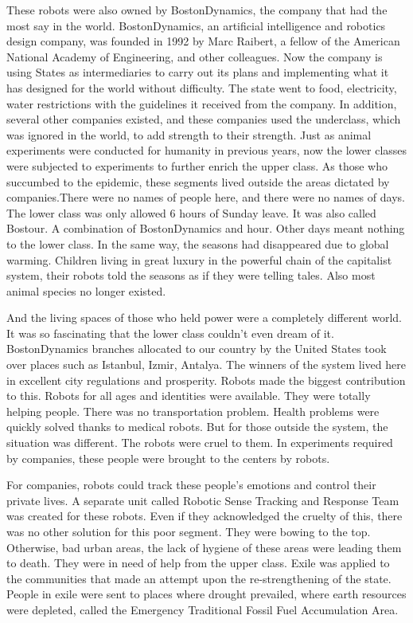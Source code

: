 \documentclass[]{book}
\begin{document}
These robots were also owned by BostonDynamics, the company that had the most say in the world. BostonDynamics, an artificial intelligence and robotics design company, was founded in 1992 by Marc Raibert, a fellow of the American National Academy of Engineering, and other colleagues. Now the company is using States as intermediaries to carry out its plans and implementing what it has designed for the world without difficulty. The state went to food, electricity, water restrictions with the guidelines it received from the company. In addition, several other companies existed, and these companies used the underclass, which was ignored in the world, to add strength to their strength. Just as animal experiments were conducted for humanity in previous years, now the lower classes were subjected to experiments to further enrich the upper class. As those who succumbed to the epidemic, these segments lived outside the areas dictated by companies.There were no names of people here, and there were no names of days. The lower class was only allowed 6 hours of Sunday leave. It was also called Bostour. A combination of BostonDynamics and hour. Other days meant nothing to the lower class. In the same way, the seasons had disappeared due to global warming. Children living in great luxury in the powerful chain of the capitalist system, their robots told the seasons as if they were telling tales. Also most animal species no longer existed.

And the living spaces of those who held power were a completely different world. It was so fascinating that the lower class couldn't even dream of it. BostonDynamics branches allocated to our country by the United States took over places such as Istanbul, Izmir, Antalya. The winners of the system lived here in excellent city regulations and prosperity. Robots made the biggest contribution to this. Robots for all ages and identities were available. They were totally helping people. There was no transportation problem. Health problems were quickly solved thanks to medical robots. But for those outside the system, the situation was different. The robots were cruel to them. In experiments required by companies, these people were brought to the centers by robots.

For companies, robots could track these people's emotions and control their private lives. A separate unit called Robotic Sense Tracking and Response Team was created for these robots. Even if they acknowledged the cruelty of this, there was no other solution for this poor segment. They were bowing to the top. Otherwise, bad urban areas, the lack of hygiene of these areas were leading them to death. They were in need of help from the upper class. Exile was applied to the communities that made an attempt upon the re-strengthening of the state. People in exile were sent to places where drought prevailed, where earth resources were depleted, called the Emergency Traditional Fossil Fuel Accumulation Area.
\end{document}
